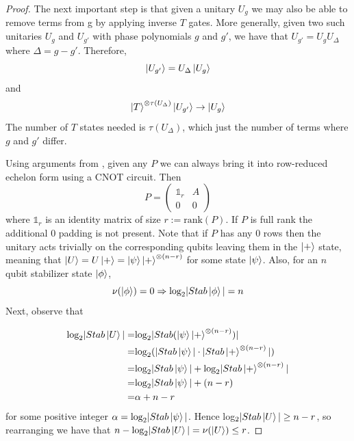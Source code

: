 \documentclass[12pt]{dalthesis}
\begin{document}
\begin{proof}
The next important step is that given a unitary $U_g$ we may also be able to remove terms from g by applying inverse $T$ gates. More generally, given two such unitaries $U_g$ and $U_{g'}$ with phase polynomials $g$ and $g'$, we have that $U_{g'} = U_g U_{\Delta}$ where $\Delta = g - g'$. Therefore, 
\begin{equation}
\ket{U_{g'}} = U_{\Delta} \ket{U_g}
\end{equation}
and 
\begin{equation}
\ket{T}^{\otimes \tau (U_{\Delta})} \ket{U_{g'}} \rightarrow \ket{U_g}
\end{equation}
The number of $T$ states needed is $\tau (U_{\Delta})$, which just the number of terms where $g$ and $g'$ differ.

Using arguments from \cite{?}, given any $P$ we can always bring it into row-reduced echelon form using a CNOT circuit. Then
\begin{equation}
P = \begin{pmatrix}
\mathds{1}_r & A \\
0 & 0
\end{pmatrix}
\end{equation}
where $\mathds{1}_r$ is an identity matrix of size $r := \text{rank}(P)$. If $P$ is full rank the additional 0 padding is not present. Note that if $P$ has any 0 rows then the unitary acts trivially on the corresponding qubits leaving them in the $\ket{+}$ state, meaning that $\ket{U} = U\ket{+} = \ket{\psi}\ket{+}^{\otimes (n-r)}$ for some state $\ket{\psi}$. Also, for an $n$ qubit stabilizer state $\ket{\phi}$, 
\begin{equation}
\nu (\ket{\phi}) = 0 \Rightarrow \text{log}_2 |Stab\ket{\phi}| = n
\end{equation} 
Next, observe that 


\begin{align*}
\text{log}_2 |Stab\ket{U}| = & \text{log}_2|Stab(\ket{\psi}\ket{+}^{\otimes (n-r)})| \\ 
= & \text{log}_2 (|Stab \ket{\psi}| \cdot |Stab\ket{+}^{\otimes (n-r)}|) \\
= & \text{log}_2 |Stab \ket{\psi}| + \text{log}_2 |Stab \ket{+}^{\otimes (n-r)}| \\
= & \text{log}_2 |Stab \ket{\psi}| + (n-r) \\
= & \alpha + n - r
\end{align*}
for some positive integer $\alpha = \text{log}_2 |Stab \ket{\psi}|$. Hence log$_2|Stab\ket{U}| \geq n - r$, so rearranging we have that $n - \text{log}_2 |Stab \ket{U}| = \nu (\ket{U}) \leq r$.


\end{proof}
\end{document}
